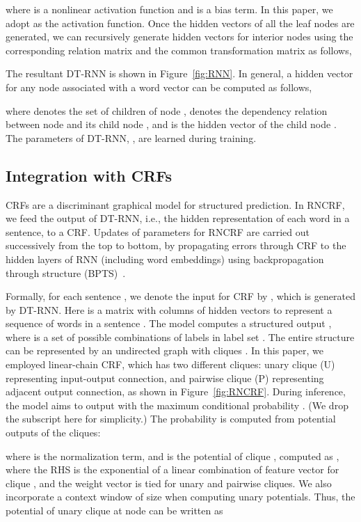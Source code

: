 \documentclass[11pt,letterpaper]{article}
\begin{document}
where  is a nonlinear activation function and  is a bias term. In this paper, we adopt  as the activation function. Once the hidden vectors of all the leaf nodes are generated, we can recursively generate hidden vectors for interior nodes using the corresponding relation matrix  and the common transformation matrix  as follows,

The resultant DT-RNN is shown in Figure~\ref{fig:RNN}. In general, a hidden vector for any node  associated with a word vector  can be computed as follows,

where  denotes the set of children of node ,  denotes the dependency relation between node  and its child node , and  is the hidden vector of the child node . The parameters of DT-RNN, , are learned during training.

\subsection{Integration with CRFs}\label{sec:crf}

CRFs are a discriminant graphical model for structured prediction. In RNCRF, we feed the output of DT-RNN, i.e., the hidden representation of each word in a sentence, to a CRF. Updates of parameters for RNCRF are carried out successively from the top to bottom, by propagating errors through CRF to the hidden layers of RNN (including word embeddings) using backpropagation through structure (BPTS)~\cite{Goller96}.

Formally, for each sentence , we denote the input for CRF by , which is generated by DT-RNN. Here  is a matrix with columns of hidden vectors  to represent a sequence of words  in a sentence . The model computes a structured output , where  is a set of possible combinations of labels in label set . The entire structure can be represented by an undirected graph  with cliques . In this paper, we employed linear-chain CRF, which has two different cliques: unary clique (U) representing input-output connection, and pairwise clique (P) representing adjacent output connection, as shown in Figure~\ref{fig:RNCRF}. During inference, the model aims to output  with the maximum conditional probability . (We drop the subscript  here for simplicity.) The probability is computed from potential outputs of the cliques:

where  is the normalization term, and  is the potential of clique , computed as
,
where the RHS is the exponential of a linear combination of feature vector  for clique , and the weight vector  is tied for unary and pairwise cliques. We also incorporate a context window of size  when computing unary potentials. Thus, the potential of unary clique at node  can be written as
\end{document}
